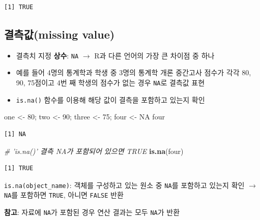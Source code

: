 \documentclass[
  11pt,
]{krantz}
\makeatletter
\newenvironment{Shaded}{\begin{snugshade}}{\end{snugshade}}
\newcommand{\CommentTok}[1]{\textcolor[rgb]{0.37,0.37,0.37}{\textit{#1}}}
\newcommand{\DecValTok}[1]{\textcolor[rgb]{0.06,0.06,0.06}{#1}}
\newcommand{\KeywordTok}[1]{\textcolor[rgb]{0.27,0.27,0.27}{\textbf{#1}}}
\newcommand{\NormalTok}[1]{#1}
\newcommand{\OtherTok}[1]{\textcolor[rgb]{0.37,0.37,0.37}{#1}}
\newcommand{\StringTok}[1]{\textcolor[rgb]{0.5,0.5,0.5}{#1}}
\providecommand{\tightlist}{%
  \setlength{\itemsep}{0pt}\setlength{\parskip}{0pt}}
\newenvironment{kframe}{%
\medskip{}
\setlength{\fboxsep}{.8em}
 \def\at@end@of@kframe{}%
 \ifinner\ifhmode%
  \def\at@end@of@kframe{\end{minipage}}%
  \begin{minipage}{\columnwidth}%
 \fi\fi%
 \def\FrameCommand##1{\hskip\@totalleftmargin \hskip-\fboxsep
 \colorbox{shadecolor}{##1}\hskip-\fboxsep
     \hskip-\linewidth \hskip-\@totalleftmargin \hskip\columnwidth}%
 \MakeFramed {\advance\hsize-\width
   \@totalleftmargin\z@ \linewidth\hsize
   \@setminipage}}%
 {\par\unskip\endMakeFramed%
 \at@end@of@kframe}
\newenvironment{rmdblock}[1]
  {
  \begin{itemize}
  \renewcommand{\labelitemi}{
    \raisebox{-.7\height}[0pt][0pt]{
      {\setkeys{Gin}{width=3em,keepaspectratio}\texttt{[image: images/\#1]}}
    }
  }
  \setlength{\fboxsep}{1em}
  \begin{kframe}
  \item
  }
  {
  \end{kframe}
  \end{itemize}
  }
\newenvironment{rmdtip}
  {\begin{rmdblock}{tip}}
  {\end{rmdblock}}
\makeatother
\begin{document}
\begin{verbatim}
[1] TRUE
\end{verbatim}

\normalsize

\hypertarget{missing-value}{%
\subsection{결측값(missing value)}\label{missing-value}}

\begin{itemize}
\tightlist
\item
  결측치 지정 \textbf{상수}: \texttt{NA} \(\rightarrow\) R과 다른 언어의 가장 큰 차이점 중 하나
\item
  예를 들어 4명의 통계학과 학생 중 3명의 통계학 개론 중간고사 점수가 각각 80, 90, 75점이고 4번 째 학생의 점수가 없는 경우 \texttt{NA}로 결측값 표현
\item
  \texttt{is.na()} 함수를 이용해 해당 값이 결측을 포함하고 있는지 확인
\end{itemize}

\footnotesize

\begin{Shaded}
\begin{Highlighting}[]
\NormalTok{one <-}\StringTok{ }\DecValTok{80}\NormalTok{; two <-}\StringTok{ }\DecValTok{90}\NormalTok{; three <-}\StringTok{ }\DecValTok{75}\NormalTok{; four <-}\StringTok{ }\OtherTok{NA}
\NormalTok{four}
\end{Highlighting}
\end{Shaded}

\begin{verbatim}
[1] NA
\end{verbatim}

\begin{Shaded}
\begin{Highlighting}[]
\CommentTok{# 'is.na()' 결측 NA가 포함되어 있으면 TRUE }
\KeywordTok{is.na}\NormalTok{(four)}
\end{Highlighting}
\end{Shaded}

\begin{verbatim}
[1] TRUE
\end{verbatim}

\normalsize

\footnotesize

\begin{rmdtip}
\begin{rmdtip}

\texttt{is.na(object\_name)}: 객체를 구성하고 있는 원소 중 \texttt{NA}를 포함하고 있는지 확인 \(\rightarrow\) \texttt{NA}를 포함하면 \texttt{TRUE}, 아니면 \texttt{FALSE} 반환

\textbf{참고}: 자료에 \texttt{NA}가 포함된 경우 연산 결과는 모두 \texttt{NA}가 반환

\end{rmdtip}
\end{rmdtip}
\end{document}
